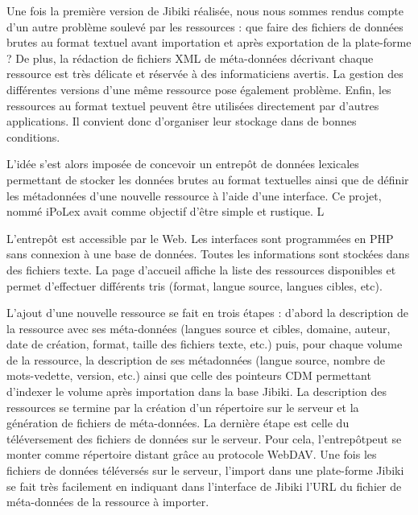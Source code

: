 \documentclass[10pt,a4paper,twoside]{article}
\begin{document}
\begin{itemize}

Une fois la première version de Jibiki réalisée, nous nous sommes rendus compte d'un autre problème soulevé par les ressources : que faire des fichiers de données brutes au format textuel avant importation et après exportation de la plate-forme ? 
De plus, la rédaction de fichiers XML de méta-données décrivant chaque ressource est très délicate et réservée à des informaticiens avertis.
La gestion des différentes versions d'une même ressource pose également problème.
Enfin, les ressources au format textuel peuvent être utilisées directement par d'autres applications. Il convient donc d'organiser leur stockage dans de bonnes conditions.

L'idée s'est alors imposée de concevoir un entrepôt de données lexicales permettant de stocker les données brutes au format textuelles ainsi que de définir les métadonnées d'une nouvelle ressource à l'aide d'une interface. Ce projet, nommé iPoLex avait comme objectif d'être simple et rustique. L

L'entrepôt est accessible par le Web. Les interfaces sont programmées en PHP sans connexion à une base de données. Toutes les informations sont stockées dans des fichiers texte. 
La page d'accueil affiche la liste des ressources disponibles et permet d'effectuer différents tris (format, langue source, langues cibles, etc).

L'ajout d'une nouvelle ressource se fait en trois étapes : d'abord la description de la ressource avec ses méta-données (langues source et cibles, domaine, auteur, date de création, format, taille des fichiers texte, etc.) puis, pour chaque volume de la ressource, la description de ses métadonnées (langue source, nombre de mots-vedette, version, etc.) ainsi que celle des pointeurs CDM permettant d'indexer le volume après importation dans la base Jibiki.
La description des ressources se termine par la création d'un répertoire sur le serveur et la génération de fichiers de méta-données.
La dernière étape est celle du téléversement des fichiers de données sur le serveur. Pour cela, l'entrepôtpeut se monter comme répertoire distant grâce au protocole WebDAV.
Une fois les fichiers de données téléversés sur le serveur, l'import dans une plate-forme Jibiki se fait très facilement en indiquant dans l'interface de Jibiki l'URL du fichier de méta-données de la ressource à importer.


\end{itemize}
\end{document}
